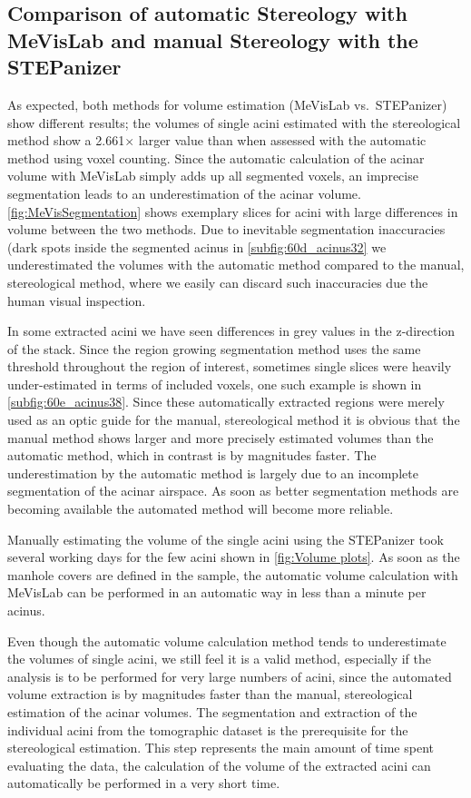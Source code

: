 \documentclass[a4paper,DIVcalc,abstract,english]{scrartcl}
\newcommand{\difference}{2.661} %
\begin{document}
\subsection[Comparison of MeVisLab with STEPanizer]{Comparison of automatic Stereology with MeVisLab and manual Stereology with the STEPanizer}
As expected, both methods for volume estimation (MeVisLab vs.\ STEPanizer) show different results; the volumes of single acini estimated with the stereological method show a \difference\(\times\) larger value than when assessed with the automatic method using voxel counting.
Since the automatic calculation of the acinar volume with MeVisLab simply adds up all segmented voxels, an imprecise segmentation leads to an underestimation of the acinar volume.
\autoref{fig:MeVisSegmentation} shows exemplary slices for acini with large differences in volume between the two methods.
Due to inevitable segmentation inaccuracies (dark spots inside the segmented acinus in \autoref{subfig:60d_acinus32} we underestimated the volumes with the automatic method compared to the manual, stereological method, where we easily can discard such inaccuracies due the human visual inspection.

In some extracted acini we have seen differences in grey values in the z-direction of the stack.
Since the region growing segmentation method uses the same threshold throughout the region of interest, sometimes single slices were heavily under-estimated in terms of included voxels, one such example is shown in \autoref{subfig:60e_acinus38}.
Since these automatically extracted regions were merely used as an optic guide for the manual, stereological method it is obvious that the manual method shows larger and more precisely estimated volumes than the automatic method, which in contrast is by magnitudes faster.
The underestimation by the automatic method is largely due to an incomplete segmentation of the acinar airspace.
As soon as better segmentation methods are becoming available the automated method will become more reliable. 

Manually estimating the volume of the single acini using the STEPanizer took several working days for the few acini shown in \autoref{fig:Volume plots}.
As soon as the manhole covers are defined in the sample, the automatic volume calculation with MeVisLab can be performed in an automatic way in less than a minute per acinus.

Even though the automatic volume calculation method tends to underestimate the volumes of single acini, we still feel it is a valid method, especially if the analysis is to be performed for very large numbers of acini, since the automated volume extraction is by magnitudes faster than the manual, stereological estimation of the acinar volumes.
The segmentation and extraction of the individual acini from the tomographic dataset is the prerequisite for the stereological estimation. This step represents the main amount of time spent evaluating the data, the calculation of the volume of the extracted acini can automatically be performed in a very short time.
\end{document}
